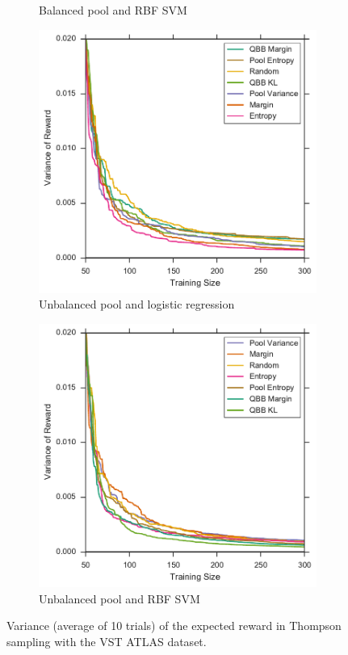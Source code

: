 \begin{figure}[p]
\begin{subfigure}{.5\textwidth}
		\caption{Balanced pool and RBF SVM}
		\label{fig:vstatlas_br_sigmas}
	\end{subfigure}
	\begin{subfigure}{.5\textwidth}
		\centering
		\includegraphics[width=\textwidth]{figures/5_thompson/vstatlas_ul_sigmas}
		\caption{Unbalanced pool and logistic regression}
		\label{fig:vstatlas_ul_sigmas}
	\end{subfigure}%
	\begin{subfigure}{.5\textwidth}
		\centering
		\includegraphics[width=\linewidth]{figures/5_thompson/vstatlas_ur_sigmas}
		\caption{Unbalanced pool and RBF SVM}
		\label{fig:vstatlas_ur_sigmas}
	\end{subfigure}
	\caption[Variance of the mean reward of heuristics (VST ATLAS)]{
		Variance (average of 10 trials) of the expected reward in Thompson sampling with the VST ATLAS dataset.}
	\label{fig:vstatlas_sigmas}
\end{figure}


